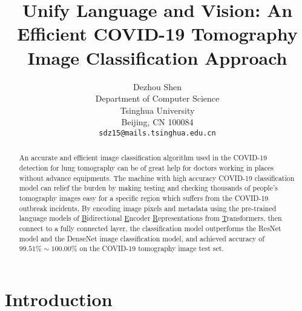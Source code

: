 \documentclass[review]{cvpr}
\begin{document}
\title{Unify Language and Vision: An Efficient COVID-19 Tomography Image Classification Approach}

\author{Dezhou Shen\\
Department of Computer Science\\
Tsinghua University\\
Beijing, CN 100084\\
{\tt\small sdz15@mails.tsinghua.edu.cn}
}

\maketitle


\begin{abstract}

  An accurate and efficient image classification algorithm used in the COVID-19 detection for lung tomography can be of great help for doctors working in places without advance equipments.
  The machine with high accuracy COVID-19 classification model can relief the burden by making testing and checking thousands of people's tomography images easy for a specific region which suffers from the COVID-19 outbreak incidents.
  By encoding image pixels and metadata using the pre-trained language models of \underline{B}idirectional \underline{E}ncoder \underline{R}epresentations from \underline{T}ransformers,
  then connect to a fully connected layer,
  the classification model outperforms the ResNet model and the DenseNet image classification model,
  and achieved accuracy of $99.51\%\sim100.00\%$ on the COVID-19 tomography image test set.

\end{abstract}

\section{Introduction}
\end{document}
